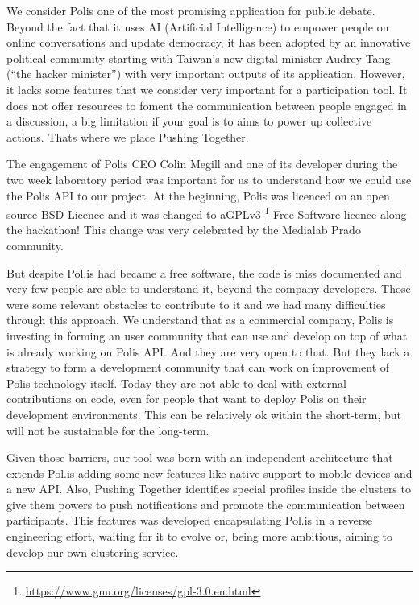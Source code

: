 \documentclass{llncs}
\begin{document}
  We consider Polis one of the most promising application for public debate.
Beyond the fact that it uses AI (Artificial Intelligence) to empower people
on online conversations and update democracy, it has been adopted by an
innovative political community starting with Taiwan's new digital minister
Audrey Tang (“the hacker minister”) with very important outputs of its
application. However, it lacks some features that we consider very important
for a participation tool. It does not offer resources to foment the
communication between people engaged in a discussion, a big limitation if your
goal is to aims to power up collective actions. Thats where we place Pushing
Together.

  The engagement of Polis CEO Colin Megill and one of its developer during the
two week laboratory period was important for us to understand how we could use
the Polis API to our project. At the beginning, Polis was licenced on an open
source BSD Licence and it was changed to
aGPLv3 \footnote{\url{https://www.gnu.org/licenses/gpl-3.0.en.html}}
Free Software licence along the hackathon! This change was very celebrated by
the Medialab Prado community.

  But despite Pol.is had became a free software, the code is miss documented and
very few people are able to understand it, beyond the company developers. Those
were some relevant obstacles to contribute to it and we had many  difficulties
through this approach. We understand that as a commercial company, Polis is
investing in forming an user community that can use and develop on top of what
is already working on Polis API. And they are very open to that. But they lack
a strategy to form a development community that can work on improvement of
Polis technology itself. Today they are not able to deal with external
contributions on code, even for people that want to deploy Polis on their
development environments. This can be relatively ok within the short-term, but
will not be sustainable for the long-term.

  Given those barriers, our tool was born with an independent architecture
that extends Pol.is adding some new features like native support to mobile
devices and a new API. Also, Pushing Together identifies special profiles
inside the clusters to give them powers to push notifications and promote the
communication between participants. This features was developed encapsulating
Pol.is in a reverse engineering effort, waiting for it to evolve or, being more
ambitious, aiming to develop our own clustering service.
\end{document}
